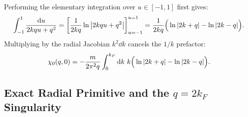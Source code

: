 \documentclass[11pt, a4paper]{article}
\numberwithin{equation}{section}
\begin{document}
Performing the elementary integration over $u \in [-1, 1]$ first gives:
\begin{equation}
  \int_{-1}^{1} \frac{\dd{u}}{2 k q u + q^2}
  = \left[ \frac{1}{2kq} \ln\abs{2kqu + q^2} \right]_{u=-1}^{u=1}
  = \frac{1}{2kq} \Big( \ln\abs{2k + q} - \ln\abs{2k - q} \Big).
\end{equation}
Multiplying by the radial Jacobian $k^2 \dd{k}$ cancels the $1/k$ prefactor:
\begin{equation}\label{eq:chi0_radial_form}
  \chi_0(q, 0) = -\frac{m}{2\pi^2 q} \int_0^{k_F} \dd{k} \, k \Big( \ln\abs{2k + q} - \ln\abs{2k - q} \Big).
\end{equation}

\subsection{Exact Radial Primitive and the $q = 2k_F$ Singularity}
\end{document}
